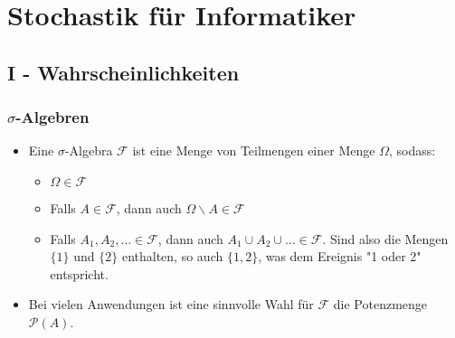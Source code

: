 \documentclass{scrartcl}
\newcommand{\mc}[1]{\mathcal{#1}}
\begin{document}
\section*{Stochastik für Informatiker}
\subsection*{I - Wahrscheinlichkeiten}
\subsubsection*{$\sigma$-Algebren}
\begin{itemize}
    \item Eine $\sigma$-Algebra $\mc{F}$ ist eine Menge von Teilmengen einer Menge $\Omega$, sodass:
    \begin{itemize}
        \item $\Omega \in \mc{F}$
        \item Falls $A \in \mc{F}$, dann auch $\Omega \backslash A \in \mc{F}$
        \item Falls $A_1, A_2, \hdots \in \mc{F}$, dann auch $A_1 \cup A_2 \cup \hdots \in \mc{F}$. Sind also die Mengen $\{1\}$ und $\{2\}$ enthalten, so auch $\{1,2\}$, was dem Ereignis "1 oder 2" entspricht.
    \end{itemize}
    \item Bei vielen Anwendungen ist eine sinnvolle Wahl für $\mc{F}$ die Potenzmenge $\mc{P}(A)$.
\end{itemize}
\end{document}
